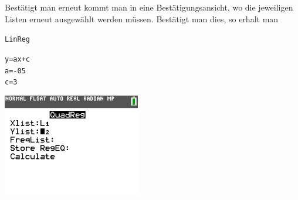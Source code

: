 \begin{paracol}{2}
	\begin{flushleft}
	Bestätigt man erneut kommt man in eine Bestätigungsansicht, wo die jeweiligen Listen erneut ausgewählt werden müssen. Bestätigt man dies, so erhalt man 
	\begin{center}
			\texttt{LinReg}\\
			\end{center}
			\texttt{y=ax+c}\\
			\texttt{a=-05}\\
			\texttt{c=3}
	\end{flushleft}	
\switchcolumn
	\begin{flushright}
		\includegraphics[width=6cm]{Media/GRT/Visualisierung/Regression/Regression_4.png}
		
	\end{flushright}
\end{paracol}
\pagebreak












